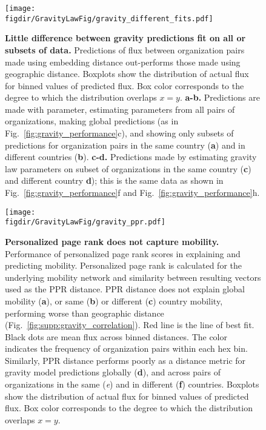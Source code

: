 \documentclass[12pt]{article} %
\def\figdir{../Figs}
\begin{document}
%
%
\begin{figure}[p!]
    \centering
    \label{fig:supp:gravity_prediction_subsets}
    \texttt{[image: \\figdir/GravityLawFig/gravity\_different\_fits.pdf]}
    \caption{
        \textbf{Little difference between gravity predictions fit on all or subsets of data.}
        Predictions of flux between organization pairs made using embedding distance out-performs those made using geographic distance.
        Boxplots show the distribution of actual flux for binned values of predicted flux.
        Box color corresponds to the degree to which the distribution overlaps $x = y$.
        \textbf{a-b.} Predictions are made with parameter, estimating parameters from all pairs of organizations, making global predictions (as in Fig.~\ref{fig:gravity_performance}c), and showing only subsets of predictions for organization pairs in the same country (\textbf{a}) and in different countries (\textbf{b}).
        \textbf{c-d.} Predictions made by estimating gravity law parameters on subset of organizations in the same country (\textbf{c}) and different country \textbf{d});
        this is the same data as shown in Fig.~\ref{fig:gravity_performance}f and Fig.~\ref{fig:gravity_performance}h.
    }
\end{figure}



%
%
\begin{figure}[p!]
    \centering
    \label{fig:supp:gravity_ppr}
    \texttt{[image: \\figdir/GravityLawFig/gravity\_ppr.pdf]}
    \caption{
        \textbf{Personalized page rank does not capture mobility.}
        Performance of personalized page rank scores in explaining and predicting mobility.
        Personalized page rank is calculated for the underlying mobility network and similarity between resulting vectors used as the PPR distance.
        PPR distance does not explain global mobility (\textbf{a}), or same (\textbf{b}) or different (\textbf{c}) country mobility, performing worse than geographic distance (Fig.~\ref{fig:supp:gravity_correlation}).
        Red line is the line of best fit.
        Black dots are mean flux across binned distances.
        The color indicates the frequency of organization pairs within each hex bin.
        Similarly, PPR distance performs poorly as a distance metric for gravity model predictions globally (\textbf{d}), and across pairs of organizations in the same (\textit{e}) and in different (\textbf{f}) countries.
        Boxplots show the distribution of actual flux for binned values of predicted flux.
        Box color corresponds to the degree to which the distribution overlaps $x = y$.
    }
\end{figure}
\end{document}
